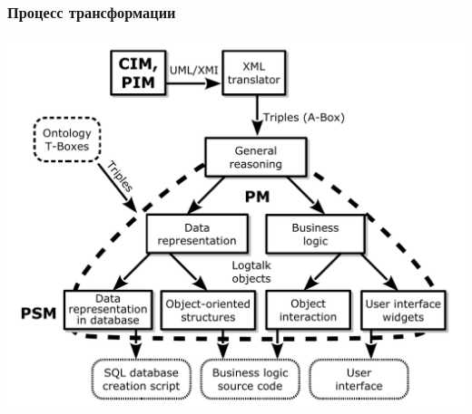 \documentclass[10pt]{beamer}
\begin{document}
\begin{frame}
  \frametitle{Процесс трансформации}
  \centering
  \includegraphics[width=0.9\linewidth]{architect_tree_pres-en-wo-OCL.pdf}
\end{frame}
\end{document}
